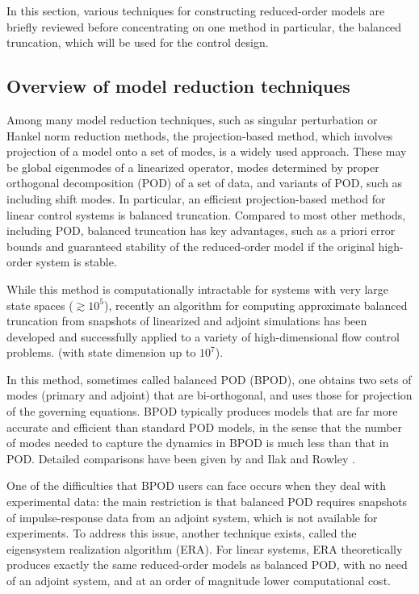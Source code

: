 \documentclass[12pt,lot, lof]{puthesis}
\begin{document}
In this section, various techniques for constructing reduced-order models are briefly reviewed  before concentrating on one method in particular, the balanced truncation, which  will be used for the control design.

\subsection{Overview of model reduction techniques}
\label{Spectrum}
Among many model reduction techniques, such as singular perturbation or Hankel norm reduction methods, the projection-based method, which involves projection of a model onto a set of modes, is a widely used approach. These may be global eigenmodes of a linearized operator, \cite{Akervik} modes determined by proper orthogonal decomposition (POD) of a set of data, \cite{Holmes} and variants of POD, such as including shift modes. \cite{Noack} In particular, an efficient projection-based method for linear control systems is balanced truncation. \cite{Moore} Compared to most other methods, including POD, balanced truncation has key advantages, such as a priori error bounds and guaranteed stability of the reduced-order model if the original high-order system is stable.

While this method is computationally intractable for systems with very large state spaces ($\gtrsim 10^5$), recently an algorithm for computing approximate balanced truncation from snapshots of linearized and adjoint simulations has been developed \cite{Rowley} and successfully applied to a variety of high-dimensional flow control problems. \cite{Ilak, Ahuja, Bagheri} (with state dimension up to $10^7$).


In this method, sometimes called balanced POD (BPOD), one obtains two sets of modes (primary and adjoint) that are bi-orthogonal, and uses those for projection of the governing equations. BPOD typically produces models that are far more accurate and efficient than standard POD models, in the sense that the number of modes needed to capture the dynamics in BPOD is much less than that in POD. Detailed comparisons have been given by \citet{Rowley} and Ilak and Rowley . \cite{Ilak}


One of the difficulties that BPOD users can face occurs when they deal with experimental data: the main restriction is that balanced POD requires snapshots of impulse-response data from an adjoint system, which is not available for experiments. To address this issue, another technique exists, called the eigensystem realization algorithm (ERA). \cite{Juang} For linear systems, ERA theoretically produces exactly the same reduced-order models as balanced POD, with no need of an adjoint system, and at an order of magnitude lower computational cost. 
\end{document}
